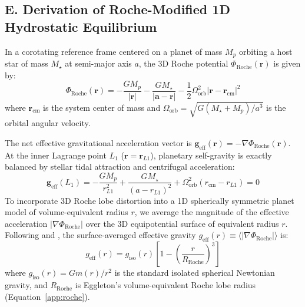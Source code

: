 \documentclass[twocolumn,10pt]{article}
\providecommand{\citet}[1]{\cite{#1}}
\begin{document}
\subsection{E. Derivation of Roche-Modified 1D Hydrostatic Equilibrium} \label{app:roche_hydrostatic_derivation}
In a corotating reference frame centered on a planet of mass $M_p$ orbiting a host star of mass $M_\star$ at semi-major axis $a$, the 3D Roche potential $\Phi_{\text{Roche}}(\mathbf{r})$ is given by:
\begin{equation}
\Phi_{\text{Roche}}(\mathbf{r}) = -\frac{G M_p}{|\mathbf{r}|} - \frac{G M_\star}{|\mathbf{a} - \mathbf{r}|} - \frac{1}{2} \Omega_{\text{orb}}^2 |\mathbf{r} - \mathbf{r}_{\text{cm}}|^2
\end{equation}
where $\mathbf{r}_{\text{cm}}$ is the system center of mass and $\Omega_{\text{orb}} = \sqrt{G(M_\star + M_p)/a^3}$ is the orbital angular velocity.

The net effective gravitational acceleration vector is $\mathbf{g}_{\text{eff}}(\mathbf{r}) = -\nabla \Phi_{\text{Roche}}(\mathbf{r})$. At the inner Lagrange point $L_1$ ($\mathbf{r} = \mathbf{r}_{L1}$), planetary self-gravity is exactly balanced by stellar tidal attraction and centrifugal acceleration:
\begin{equation}
\mathbf{g}_{\text{eff}}(L_1) = -\frac{G M_p}{r_{L1}^2} + \frac{G M_\star}{(a - r_{L1})^2} + \Omega_{\text{orb}}^2 (r_{\text{cm}} - r_{L1}) = 0
\end{equation}
To incorporate 3D Roche lobe distortion into a 1D spherically symmetric planet model of volume-equivalent radius $r$, we average the magnitude of the effective acceleration $|\nabla \Phi_{\text{Roche}}|$ over the 3D equipotential surface of equivalent radius $r$. Following \citet{Kippenhahn1990} and \citet{Jackson2017}, the surface-averaged effective gravity $g_{\text{eff}}(r) \equiv \langle |\nabla \Phi_{\text{Roche}}| \rangle$ is:
\begin{equation}
g_{\text{eff}}(r) = g_{\text{iso}}(r) \left[ 1 - \left(\frac{r}{R_{\text{Roche}}}\right)^3 \right]
\end{equation}
where $g_{\text{iso}}(r) = G m(r) / r^2$ is the standard isolated spherical Newtonian gravity, and $R_{\text{Roche}}$ is Eggleton's volume-equivalent Roche lobe radius (Equation~\ref{app:roche}).
\end{document}
